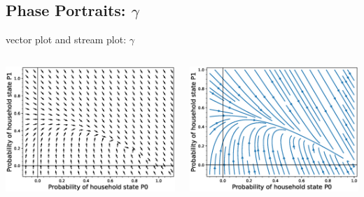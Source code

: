 \documentclass[smaller,aspectratio=169, toc=bibliography]{beamer}
\begin{document}
\subsection*{Phase Portraits: $\gamma$ }
\begin{frame}{vector plot and stream plot: $\gamma$}
\begin{columns}[c]
        \begin{center}
        \includegraphics[scale=0.3]{phase_portrait/043_a3.eps}
        \caption{\(\alpha=0.4, \beta=0.2, \gamma=0.6\)} 
        \end{center}
        \begin{center}
        \includegraphics[scale=0.3]{phase_portrait/043_a3s.eps}
        \caption{\(\alpha=0.4, \beta=0.2, \gamma=0.6\)}
        \end{center}  
\end{columns}
\end{frame}
\end{document}
